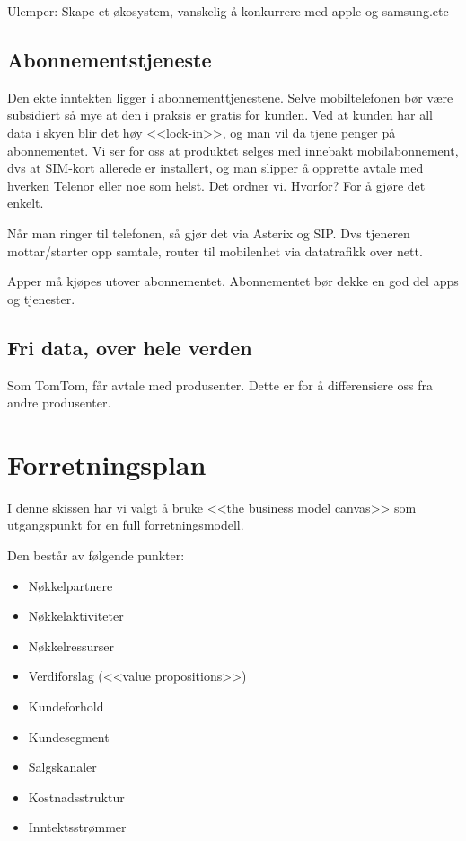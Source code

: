 Ulemper: Skape et økosystem, vanskelig å konkurrere med apple og samsung.etc

\section{Abonnementstjeneste}

Den ekte inntekten ligger i abonnementtjenestene. Selve mobiltelefonen bør være
subsidiert så mye at den i praksis er gratis for kunden. Ved at kunden har all
data i skyen blir det høy <<lock-in>>, og man vil da tjene penger på
abonnementet. Vi ser for oss at produktet selges med innebakt mobilabonnement,
dvs at SIM-kort allerede er installert, og man slipper å opprette avtale med
hverken Telenor eller noe som helst. Det ordner vi. Hvorfor? For å gjøre det
enkelt.

Når man ringer til telefonen, så gjør det via Asterix og SIP. Dvs tjeneren
mottar/starter opp samtale, router til mobilenhet via datatrafikk over nett.

Apper må kjøpes utover abonnementet. Abonnementet bør dekke en god del apps og
tjenester. 

\section{Fri data, over hele verden}

Som TomTom, får avtale med produsenter. Dette er for å differensiere oss fra
andre produsenter.


\chapter{Forretningsplan}

I denne skissen har vi valgt å bruke <<the business model canvas>>
\cite{oswalder} som utgangspunkt for en full forretningsmodell.

Den består av følgende punkter:

\begin{itemize}
  \item Nøkkelpartnere
  \item Nøkkelaktiviteter
  \item Nøkkelressurser
  \item Verdiforslag (<<value propositions>>)
  \item Kundeforhold
  \item Kundesegment
  \item Salgskanaler
  \item Kostnadsstruktur
  \item Inntektsstrømmer
\end{itemize}

